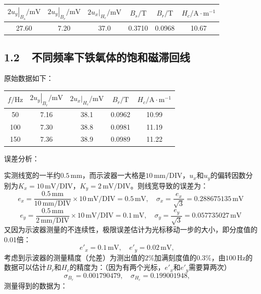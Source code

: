 \documentclass[a4paper,fontset=windows]{ctexart}
\begin{document}
\begin{table}[!ht]
    \centering
    \begin{tabular}{|c|c|c|c|c|c|}
        \hline
        $\left.2u_y\right|_{B_s}/\mathrm{mV}$ & $\left.2u_y\right|_{B_r}/\mathrm{mV}$ & $\left.2u_x\right|_{H_c}/\mathrm{mV}$ & $B_s/\mathrm{T}$ & $B_r/\mathrm{T}$ & $H_c/\mathrm{A \cdot m^{-1}}$ \\
        \hline
        27.60 & 7.20 & 37.0 & 0.3710 & 0.0968 & 10.67 \\
        \hline
    \end{tabular}
\end{table}

\subsection*{1.2\ \ 不同频率下铁氧体的饱和磁滞回线}

原始数据如下：

\begin{table}[!ht]
    \centering
    \begin{tabular}{|c|c|c|c|c|}
        \hline
        $f/\mathrm{Hz}$ & $\left.2u_y\right|_{B_r}/\mathrm{mV}$ & $\left.2u_x\right|_{H_c}/\mathrm{mV}$ & $B_r/\mathrm{T}$ & $H_c/\mathrm{A \cdot m^{-1}}$ \\
        \hline
        50 & 7.16 & 38.1 & 0.0962 & 10.99 \\
        \hline
        100 & 7.30 & 38.8 & 0.0981 & 11.19 \\
        \hline
        150 & 7.36 & 38.9 & 0.0989 & 11.22 \\
        \hline
    \end{tabular}
\end{table}

误差分析：

实测线宽的一半约$0.5\,\mathrm{mm}$，而示波器一大格是$10\,\mathrm{mm/DIV}$，$u_x$和$u_y$的偏转因数分别为$K_x=10\,\mathrm{mV/DIV}$，$K_y=2\,\mathrm{mV/DIV}$。则线宽导致的误差为：
\[
e_x = \frac{0.5\,\mathrm{mm}}{10\,\mathrm{mm/DIV}}\times10\,\mathrm{mV/DIV} = 0.5\,\mathrm{mV},\quad
\sigma_x = \frac{e_x}{\sqrt{3}} = 0.288675135\,\mathrm{mV}
\]
\[
e_y = \frac{0.5\,\mathrm{mm}}{2\,\mathrm{mm/DIV}}\times10\,\mathrm{mV/DIV} = 0.1\,\mathrm{mV},\quad
\sigma_y = \frac{e_y}{\sqrt{3}} = 0.057735027\,\mathrm{mV}
\]
又因为示波器测量的不连续性，极限误差估计为光标移动一步的大小，即分度值的0.01倍：
\[
e'_x = 0.1\,\mathrm{mV},\quad
e'_y = 0.02\,\mathrm{mV},\quad
\]
考虑到示波器的测量精度（允差）为测出值的$2\%$加满刻度值的$0.3\%$，由$100\,\mathrm{Hz}$的数据可以估计$B_r$和$H_c$的精度为：（因为有两个光标，$e'_x$和$e'_y$需要算两次）
\[
\sigma_{B_r} = 0.001790479,\quad
\sigma_{H_c} = 0.199001948,\quad
\]
测量得到的数据为：
\end{document}
